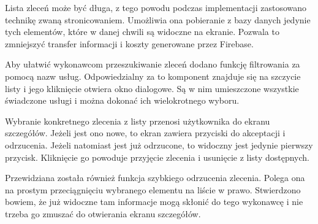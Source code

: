 Lista zleceń może być długa, z tego powodu podczas implementacji zastosowano technikę zwaną stronicowaniem. Umożliwia ona pobieranie z bazy danych jedynie tych elementów, które w danej chwili są widoczne na ekranie. Pozwala to zmniejszyć transfer informacji i koszty generowane przez Firebase. 

Aby ułatwić wykonawcom przeszukiwanie zleceń dodano funkcję filtrowania za pomocą nazw usług. Odpowiedzialny za to komponent znajduje się na szczycie listy i jego kliknięcie otwiera okno dialogowe. Są w nim umieszczone wszystkie świadczone usługi i można dokonać ich wielokrotnego wyboru. 

Wybranie konkretnego zlecenia z listy przenosi użytkownika do ekranu szczegółów. Jeżeli jest ono nowe, to ekran zawiera przyciski do akceptacji i odrzucenia. Jeżeli natomiast jest już odrzucone, to widoczny jest jedynie pierwszy przycisk. Kliknięcie go powoduje przyjęcie zlecenia i usunięcie z listy dostępnych. 

Przewidziana została również funkcja szybkiego odrzucenia zlecenia. Polega ona na prostym przeciągnięciu wybranego elementu na liście w prawo. Stwierdzono bowiem, że już widoczne tam informacje mogą skłonić do tego wykonawcę i nie trzeba go zmuszać do otwierania ekranu szczegółów.